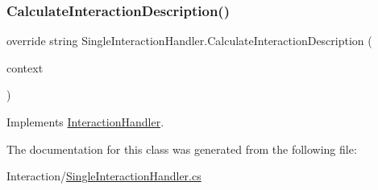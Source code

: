 \subsubsection{\texorpdfstring{Calculate\+Interaction\+Description()}{CalculateInteractionDescription()}}
{\footnotesize\ttfamily override string Single\+Interaction\+Handler.\+Calculate\+Interaction\+Description (\begin{DoxyParamCaption}\item[{\mbox{\hyperlink{class_interaction_context}{Interaction\+Context}}}]{context }\end{DoxyParamCaption})\hspace{0.3cm}{\ttfamily [virtual]}}



Implements \mbox{\hyperlink{class_interaction_handler_acdd154cb8b276e122915412b3b7274d3}{Interaction\+Handler}}.



The documentation for this class was generated from the following file\+:\begin{DoxyCompactItemize}
\item 
Interaction/\mbox{\hyperlink{_single_interaction_handler_8cs}{Single\+Interaction\+Handler.\+cs}}\end{DoxyCompactItemize}

